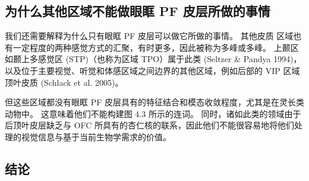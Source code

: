 \subsection{为什么其他区域不能做眼眶 PF 皮层所做的事情}
我们还需要解释为什么只有眼眶 PF 皮层可以做它所做的事情。 其他皮质
区域也有一定程度的两种感觉方式的汇聚，有时更多，因此被称为多峰或多峰。 上颞区如颞上多感觉区 (STP)（也称为区域 TPO）属于此类
(Seltzer \& Pandya 1994)，以及位于主要视觉、听觉和体感区域之间边界的其他区域，例如后部的 VIP 区域顶叶皮质 (Schlack et al. 2005)。\par
但这些区域都没有眼眶 PF 皮层具有的特征结合和模态收敛程度，尤其是在灵长类动物中。 这意味着他们不能构建图 4.3 所示的连词。 同时，诸如此类的领域由于后顶叶皮层缺乏与 OFC 所具有的杏仁核的联系，因此他们不能很容易地将他们处理的视觉信息与基于当前生物学需求的价值。\par

\subsection{结论}


